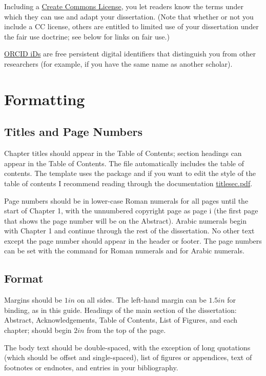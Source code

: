 \documentclass[12pt]{report}
\begin{document}
Including a \href{https://creativecommons.org/licenses/}{Create Commons License}, you let readers know the terms under which they can use and adapt your dissertation. (Note that whether or not you include a CC license, others are entitled to limited use of your dissertation under the fair use doctrine; see below for links on fair use.)

\href{https://orcid.org/}{ORCID iDs} are free persistent digital identifiers that distinguish you from other researchers (for example, if you have the same name as another scholar).
\newpage
\chapter{Formatting}
\section{Titles and Page Numbers}
Chapter titles should appear in the Table of Contents; section headings can appear in the Table of Contents. The  file automatically includes the table of contents. The template uses the  package and if you want to edit the style of the table of contents I recommend reading through the documentation \href{https://github.com/cacsphysics/BMC_Template_Info_Files/blob/main/titlesec.pdf}{titlesec.pdf}. 

Page numbers should be in lower-case Roman numerals for all pages until the start of Chapter 1, with the unnumbered copyright page as page i (the first page that shows the page number will be on the Abstract). Arabic numerals begin with Chapter 1 and continue through the rest of the dissertation. No other text except the page number should appear in the header or footer. The page numbers can be set with the command  for Roman numerals and  for Arabic numerals.
\section{Format}
Margins should be $1in$ on all sides. The left-hand margin can be $1.5in$ for binding, as in this guide. Headings of the main section of the dissertation: Abstract, Acknowledgements, Table of Contents, List of Figures, and each chapter; should begin $2in$ from the top of the page.

The body text should be double-spaced, with the exception of long quotations (which should be offset and single-spaced), list of figures or appendices, text of footnotes or endnotes, and entries in your bibliography.
\end{document}
